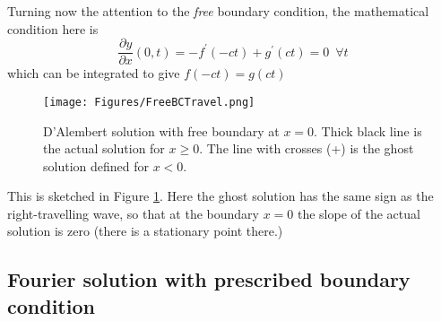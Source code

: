 \documentclass[11pt,twoside,a4paper,english]{book}
\begin{document}
\medskip \medskip 

\noindent Turning now the attention to the \emph{free} boundary condition, the mathematical condition here is
\begin{equation}
\frac{\partial y}{\partial x}(0,t)=-f^\prime(-ct)+g^\prime(ct) = 0 \,\,\, \forall t
\end{equation}
which can be integrated to give $f(-ct)=g(ct)$
\begin{figure}[hbt]
\texttt{[image: Figures/FreeBCTravel.png]}
\caption{D'Alembert solution with free boundary at $x=0$. Thick black line is the actual solution for $x\geq 0$. The line with crosses (+) is the ghost solution defined for $x<0$.}\label{fig:DalFree}
\end{figure}
This is sketched in Figure \ref{fig:DalFree}. Here the ghost solution has the same sign as the right-travelling wave, so that at the boundary $x=0$ the slope of the actual solution is zero (there is a stationary point there.)


\subsection{Fourier solution with prescribed boundary condition}
\end{document}
